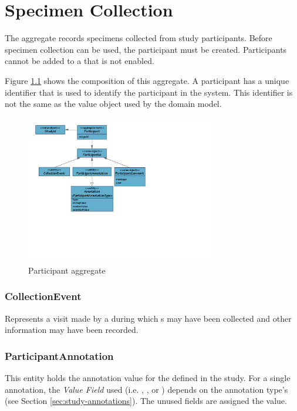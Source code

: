 \chapter{Specimen Collection}

The  aggregate records specimens collected
from study participants. Before specimen collection can be used, the
participant must be created. Participants cannot be added to a
 that is not enabled.

Figure \ref{fig:participant-aggregate} shows the composition of this aggregate.
A participant has a unique identifier that is used to identify the participant
in the system. This identifier is not the same as the
 value object used by the domain model.


\begin{figure}[H]
  \centering
  \includegraphics[trim={10mm 75mm 102mm 10mm}, clip,
    width=0.75\textwidth]{images/participant-aggregate}
  \caption{Participant aggregate}
  \label{fig:participant-aggregate}
\end{figure}

\subsection*{CollectionEvent}
Represents a visit made by a  during which
s may have been collected and other information may have
been recorded.

\subsection*{ParticipantAnnotation}
This entity holds the annotation value for the
 defined in the study. For a single
annotation, the \emph{Value Field} used (i.e. ,
, or ) depends on the annotation
type's  (see Section \ref{sec:study-annotations}). The
unused fields are assigned the  value.

